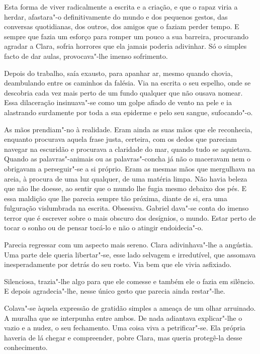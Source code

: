 Esta forma de viver radicalmente a escrita e a criação, e que o rapaz
viria a herdar, afastara"-o definitivamente do mundo e dos pequenos
gestos, das conversas quotidianas, dos outros, dos amigos que o faziam
perder tempo. E sempre que fazia um esforço para romper um pouco a sua
barreira, procurando agradar a Clara, sofria horrores que ela jamais
poderia adivinhar. Só o simples facto de dar aulas, provocava"-lhe imenso
sofrimento.

Depois do trabalho, saía exausto, para apanhar ar, mesmo quando chovia,
deambulando entre os caminhos da falésia. Via na escrita o seu espelho,
onde se descobria cada vez mais perto de um fundo qualquer que não
ousava nomear. Essa dilaceração insinuava"-se como um golpe afiado de
vento na pele e ia alastrando surdamente por toda a sua epiderme e pelo
seu sangue, sufocando"-o.

As mãos prendiam"-no à realidade. Eram ainda as suas mãos que ele
reconhecia, enquanto procurava aquela frase justa, certeira, com os
dedos que pareciam navegar na escuridão e procurava a claridade do mar,
quando tudo se aquietava. Quando as palavras"-animais ou as
palavras"-concha já não o maceravam nem o obrigavam a perseguir"-se a si
próprio. Eram as mesmas mãos que mergulhava na areia, à procura de uma
luz qualquer, de uma matéria limpa. Não havia beleza que não lhe doesse,
ao sentir que o mundo lhe fugia mesmo debaixo dos pés. E essa maldição
que lhe parecia sempre tão próxima, diante de si, era uma fulguração
vislumbrada na escrita. Obsessiva. Gabriel dava"-se conta do imenso
terror que é escrever sobre o mais obscuro dos desígnios, o mundo. Estar
perto de tocar o sonho ou de pensar tocá-lo e não o atingir
endoidecia"-o.

Parecia regressar com um aspecto mais sereno. Clara adivinhava"-lhe a
angústia. Uma parte dele queria libertar"-se, esse lado selvagem e
irredutível, que assomava inesperadamente por detrás do seu rosto. Via
bem que ele vivia asfixiado.

Silenciosa, trazia"-lhe algo para que ele comesse e também ele o fazia em
silêncio. E depois agradecia"-lhe, nesse único gesto que parecia ainda
restar"-lhe.

Colava"-se àquela expressão de gratidão simples a ameaça de um olhar
arruinado. A muralha que se interpunha entre ambos. De nada adiantava
explicar"-lhe o vazio e a nudez, o seu fechamento. Uma coisa viva a
petrificar"-se. Ela própria haveria de lá chegar e compreender, pobre
Clara, mas queria protegê-la desse conhecimento.

